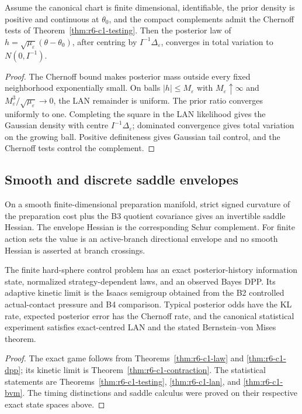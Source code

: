 \begin{theorem}
\label{thm:r6-c1-bvm}
Assume the canonical chart is finite dimensional, identifiable, the prior
density is positive and continuous at \(\theta_0\), and the compact
complements admit the Chernoff tests of
Theorem~\ref{thm:r6-c1-testing}.  Then the posterior law of
\(h=\sqrt{\mu_\varepsilon}(\theta-\theta_0)\), after centring by
\(I^{-1}\Delta_\varepsilon\), converges in total variation to
\(N(0,I^{-1})\).
\end{theorem}

\begin{proof}
The Chernoff bound makes posterior mass outside every fixed neighborhood
exponentially small.  On balls \(|h|\le M_\varepsilon\) with
\(M_\varepsilon\uparrow\infty\) and
\(M_\varepsilon^3/\sqrt{\mu_\varepsilon}\to0\), the LAN remainder is uniform.
The prior ratio converges uniformly to one.  Completing the square in the LAN
likelihood gives the Gaussian density with centre
\(I^{-1}\Delta_\varepsilon\); dominated convergence gives total variation on
the growing ball.  Positive definiteness gives Gaussian tail control, and the
Chernoff tests control the complement.
\end{proof}

\subsection{Smooth and discrete saddle envelopes}

On a smooth finite-dimensional preparation manifold, strict signed curvature
of the preparation cost plus the B3 quotient covariance gives an invertible
saddle Hessian.  The envelope Hessian is the corresponding Schur complement.
For finite action sets the value is an active-branch directional envelope and
no smooth Hessian is asserted at branch crossings.

\begin{theorem}
\label{thm:r6-c1-main}
The finite hard-sphere control problem has an exact posterior-history
information state, normalized strategy-dependent laws, and an observed Bayes
DPP.  Its adaptive kinetic limit is the Isaacs semigroup obtained from the B2
controlled actual-contact pressure and B4 comparison.  Typical posterior odds
have the KL rate, expected posterior error has the Chernoff rate, and the
canonical statistical experiment satisfies exact-centred LAN and the stated
Bernstein--von Mises theorem.
\end{theorem}

\begin{proof}
The exact game follows from Theorems~\ref{thm:r6-c1-law} and
\ref{thm:r6-c1-dpp}; its kinetic limit is
Theorem~\ref{thm:r6-c1-contraction}.  The statistical statements are
Theorems~\ref{thm:r6-c1-testing}, \ref{thm:r6-c1-lan}, and
\ref{thm:r6-c1-bvm}.  The timing distinctions and saddle calculus were proved
on their respective exact state spaces above.
\end{proof}
